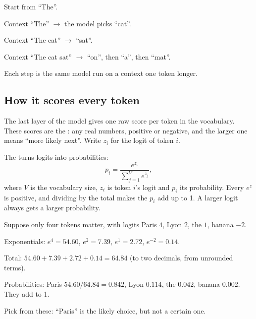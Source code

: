 \begin{example}
Start from ``The''.
\begin{steps}
  \item Context ``The'' $\to$ the model picks ``cat''.
  \item Context ``The cat'' $\to$ ``sat''.
  \item Context ``The cat sat'' $\to$ ``on'', then ``a'', then ``mat''.
\end{steps}
Each step is the same model run on a context one token longer.
\end{example}

\subsection*{How it scores every token}

\begin{definition}[Logits]
The last layer of the model gives one raw score per token in the vocabulary. These scores are the : any real numbers, positive or negative, and the larger one means ``more likely next''. Write $z_i$ for the logit of token $i$.
\end{definition}

\begin{definition}
The  turns logits into probabilities:
\[
p_i = \frac{e^{z_i}}{\sum_{j=1}^{V} e^{z_j}},
\]
where $V$ is the vocabulary size, $z_i$ is token $i$'s logit and $p_i$ its probability. Every $e^{z}$ is positive, and dividing by the total makes the $p_i$ add up to 1. A larger logit always gets a larger probability.
\end{definition}

\begin{example}
Suppose only four tokens matter, with logits Paris $4$, Lyon $2$, the $1$, banana $-2$.
\begin{steps}
  \item Exponentials: $e^4 = 54.60$, $e^2 = 7.39$, $e^1 = 2.72$, $e^{-2} = 0.14$.
  \item Total: $54.60 + 7.39 + 2.72 + 0.14 = 64.84$ (to two decimals, from unrounded terms).
  \item Probabilities: Paris $54.60/64.84 = 0.842$, Lyon $0.114$, the $0.042$, banana $0.002$. They add to 1.
  \item Pick from these: ``Paris'' is the likely choice, but not a certain one.
\end{steps}
\end{example}

